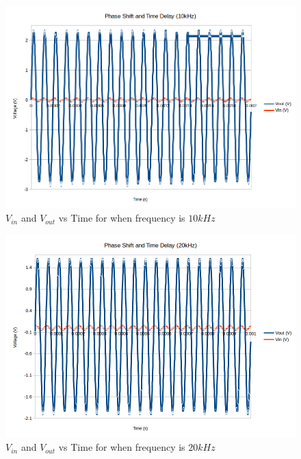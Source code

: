 \documentclass[10pt]{article}
\begin{document}
\begin{figure}[H]
	\centering
	\includegraphics[width=\textwidth]{PhaseShift10.png}
	\caption{$V_{in}$ and $V_{out}$ vs Time for when frequency is $10kHz$}
\end{figure}
\begin{figure}[H]
	\centering
	\includegraphics[width=\textwidth]{PhaseShift20.png}
	\caption{$V_{in}$ and $V_{out}$ vs Time for when frequency is $20kHz$}
\end{figure}
\end{document}
